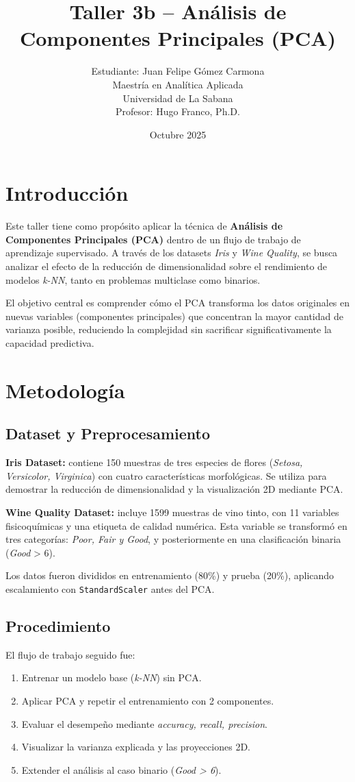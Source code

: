 \documentclass[12pt]{article}
\title{Taller 3b – Análisis de Componentes Principales (PCA)}
\author{Estudiante: Juan Felipe Gómez Carmona \\ 
Maestría en Analítica Aplicada \\
Universidad de La Sabana \\ 
Profesor: Hugo Franco, Ph.D.}
\date{Octubre 2025}
\begin{document}
\maketitle
\tableofcontents
\newpage

\section{Introducción}
Este taller tiene como propósito aplicar la técnica de \textbf{Análisis de Componentes Principales (PCA)} dentro de un flujo de trabajo de aprendizaje supervisado. A través de los datasets \textit{Iris} y \textit{Wine Quality}, se busca analizar el efecto de la reducción de dimensionalidad sobre el rendimiento de modelos \textit{k-NN}, tanto en problemas multiclase como binarios. 

El objetivo central es comprender cómo el PCA transforma los datos originales en nuevas variables (componentes principales) que concentran la mayor cantidad de varianza posible, reduciendo la complejidad sin sacrificar significativamente la capacidad predictiva. 

\section{Metodología}

\subsection{Dataset y Preprocesamiento}
\textbf{Iris Dataset:} contiene 150 muestras de tres especies de flores (\textit{Setosa, Versicolor, Virginica}) con cuatro características morfológicas. Se utiliza para demostrar la reducción de dimensionalidad y la visualización 2D mediante PCA.

\textbf{Wine Quality Dataset:} incluye 1599 muestras de vino tinto, con 11 variables fisicoquímicas y una etiqueta de calidad numérica. Esta variable se transformó en tres categorías: \textit{Poor, Fair y Good}, y posteriormente en una clasificación binaria (\textit{Good} > 6).

Los datos fueron divididos en entrenamiento (80\%) y prueba (20\%), aplicando escalamiento con \texttt{StandardScaler} antes del PCA.

\subsection{Procedimiento}
El flujo de trabajo seguido fue:
\begin{enumerate}
    \item Entrenar un modelo base (\textit{k-NN}) sin PCA.
    \item Aplicar PCA y repetir el entrenamiento con 2 componentes.
    \item Evaluar el desempeño mediante \textit{accuracy, recall, precision}.
    \item Visualizar la varianza explicada y las proyecciones 2D.
    \item Extender el análisis al caso binario (\textit{Good > 6}).
\end{enumerate}
\end{document}
